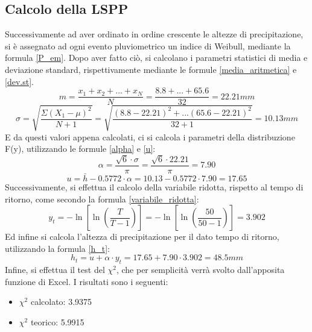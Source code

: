 \subsection{Calcolo della LSPP}
Successivamente ad aver ordinato in ordine crescente le altezze di precipitazione, si è assegnato ad ogni evento pluviometrico un indice di Weibull, mediante la formula \ref{P_em}.
Dopo aver fatto ciò, si calcolano i parametri statistici di media e deviazione standard, rispettivamente mediante le formule \ref{media_aritmetica} e \ref{dev.st}. \\

\begin{equation}
      m = \frac{x_1+x_2+...+x_N}{N} = \frac{8.8+...+65.6}{32} = 22.21 mm
\end{equation}
\begin{equation}
      \sigma = \sqrt{\frac{\Sigma(X_1 - \mu)^2}{N+1}}= \sqrt{\frac{(8.8 - 22.21)^2+...(65.6-22.21)^2}{32+1}} = 10.13 mm
\end{equation}
E da questi valori appena calcolati, ci si calcola i parametri della distribuzione F(y), utilizzando le formule \ref{alpha} e \ref{u}:
\begin{equation}
    \alpha = \frac{\sqrt{6} \cdot \sigma}{\pi} = \frac{\sqrt{6} \cdot 22.21}{\pi} = 7.90
\end{equation}
\begin{equation}
    u = \bar{h} - 0.5772 \cdot \alpha = 10.13- 0.5772 \cdot 7.90 = 17.65
\end{equation}
Successivamente, si effettua il calcolo della variabile ridotta, rispetto al tempo di ritorno, come secondo la formula \ref{variabile_ridotta}:
\begin{equation}
y_{t}= -\ln \left[ \ln \left(\frac{T}{T-1} \right) \right] = -\ln \left[\ln \left( \frac{50}{50-1} \right) \right ] = 3.902
\end{equation}
Ed infine si calcola l'altezza di precipitazione per il dato tempo di ritorno, utilizzando la formula \ref{h_t}:
\begin{equation}
h_t = u + \alpha \cdot y_t  = 17.65 + 7.90 \cdot 3.902= 48.5mm
\end{equation}
Infine, si effettua il test del $\chi^2$, che per semplicità verrà svolto dall'apposita funzione di Excel. I risultati sono i seguenti: 
\begin{itemize}
    \item $\chi ^2$ calcolato: 3.9375
    \item $\chi ^2$ teorico: 5.9915
\end{itemize}
